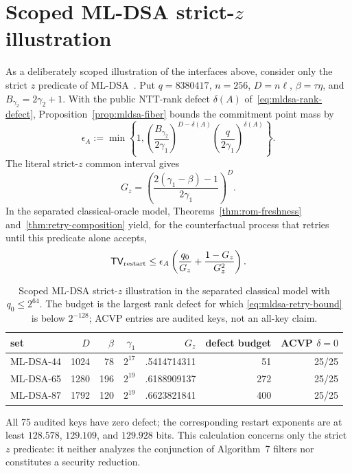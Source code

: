 \documentclass[pdflatex,sn-mathphys-num]{sn-jnl}
\theoremstyle{thmstyleone}
\theoremstyle{thmstyletwo}
\newcommand{\TV}{\mathsf{TV}}
\begin{document}
\section{Scoped ML-DSA strict-\texorpdfstring{$z$}{z} illustration}
\label{app:mldsa-illustration}

As a deliberately scoped illustration of the interfaces above, consider only
the strict $z$ predicate of ML-DSA~\cite{FIPS204}.  Put $q=8380417$, $n=256$,
$D=n\ell$, $\beta=\tau\eta$, and $B_{\gamma_2}=2\gamma_2+1$.  With the public
NTT-rank defect $\delta(A)$ of~\eqref{eq:mldsa-rank-defect},
Proposition~\ref{prop:mldsa-fiber} bounds the commitment point mass by
\begin{equation}
 \epsilon_A:=
 \min\left\{1,
 \left(\frac{B_{\gamma_2}}{2\gamma_1}\right)^{D-\delta(A)}
 \left(\frac q{2\gamma_1}\right)^{\delta(A)}\right\}.
 \label{eq:mldsa-point-mass}
\end{equation}
The literal strict-$z$ common interval gives
\begin{equation}
 G_z=\left(\frac{2(\gamma_1-\beta)-1}{2\gamma_1}\right)^D.
 \label{eq:Afips}
\end{equation}
In the separated classical-oracle model,
Theorems~\ref{thm:rom-freshness} and~\ref{thm:retry-composition} yield,
for the counterfactual process that retries until this predicate alone
accepts,
\begin{equation}
 \TV_{\rm restart}\le
 \epsilon_A\left(\frac{q_0}{G_z}+\frac{1-G_z}{G_z^2}\right).
 \label{eq:mldsa-retry-bound}
\end{equation}

\begin{table}[ht]
\centering
\caption{Scoped ML-DSA strict-$z$ illustration in the separated classical
model with $q_0\le2^{64}$.  The budget is the largest rank defect for which
\eqref{eq:mldsa-retry-bound} is below $2^{-128}$; ACVP entries are audited
keys, not an all-key claim.}
\label{tab:mldsa-compact}
\small
\begin{tabular}{lrrrrrr}
\toprule
set & $D$ & $\beta$ & $\gamma_1$ & $G_z$ & defect budget & ACVP $\delta=0$\\
\midrule
ML-DSA-44 & 1024 & 78  & $2^{17}$ & .5414714311 & 51  & 25/25\\
ML-DSA-65 & 1280 & 196 & $2^{19}$ & .6188909137 & 272 & 25/25\\
ML-DSA-87 & 1792 & 120 & $2^{19}$ & .6623821841 & 400 & 25/25\\
\bottomrule
\end{tabular}
\end{table}

All 75 audited keys have zero defect; the corresponding restart exponents are
at least $128.578$, $129.109$, and $129.928$ bits.  This calculation concerns
only the strict $z$ predicate: it neither analyzes the conjunction of
Algorithm~7 filters nor constitutes a security reduction.


\end{document}
